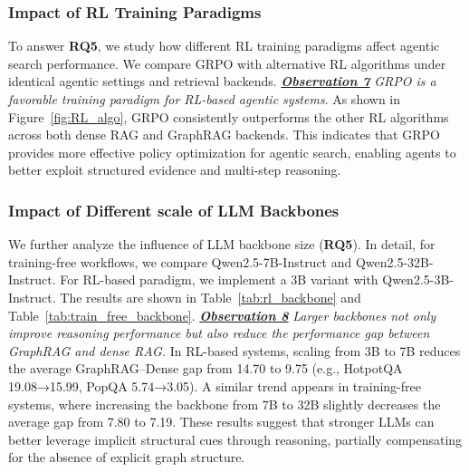 \subsubsection{Impact of RL Training Paradigms}
To answer \textbf{RQ5}, we study how different RL training paradigms affect agentic search performance. We compare GRPO with alternative RL algorithms under identical agentic settings and retrieval backends. \textbf{\textit{\underline{Observation 7}}} \textit{GRPO is a favorable training paradigm for RL-based agentic systems}. As shown in Figure~\ref{fig:RL_algo}, GRPO consistently outperforms the other RL algorithms across both dense RAG and GraphRAG backends. This indicates that GRPO provides more effective policy optimization for agentic search, enabling agents to better exploit structured evidence and multi-step reasoning.

\subsubsection{Impact of Different scale of LLM Backbones}
We further analyze the influence of LLM backbone size (\textbf{RQ5}). In detail, for training-free workflows, we compare Qwen2.5-7B-Instruct and Qwen2.5-32B-Instruct. For RL-based paradigm, we implement a 3B variant with Qwen2.5-3B-Instruct. The results are shown in Table~\ref{tab:rl_backbone} and Table~\ref{tab:train_free_backbone}. \textbf{\textit{\underline{Observation 8}}} \textit{Larger backbones not only improve reasoning performance but also reduce the performance gap between GraphRAG and dense RAG.} In RL-based systems, scaling from 3B to 7B reduces the average GraphRAG–Dense gap from 14.70 to 9.75 (e.g., HotpotQA 19.08→15.99, PopQA 5.74→3.05). A similar trend appears in training-free systems, where increasing the backbone from 7B to 32B slightly decreases the average gap from 7.80 to 7.19. These results suggest that stronger LLMs can better leverage implicit structural cues through reasoning, partially compensating for the absence of explicit graph structure.

